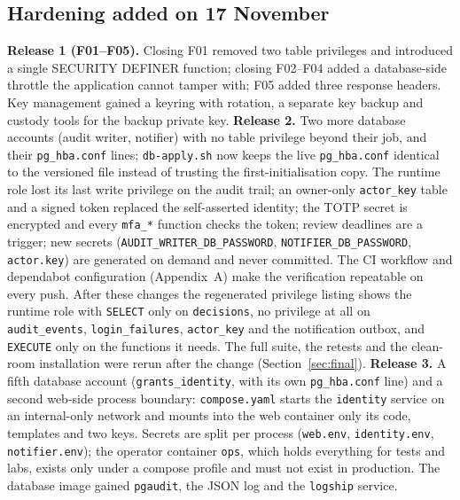\documentclass[10pt,a4paper]{article}
\newcommand{\code}[1]{\nolinkurl{#1}}
\begin{document}
\subsection{Hardening added on 17 November}
\textbf{Release 1 (F01--F05).} Closing F01 removed two table privileges and introduced a single SECURITY DEFINER function; closing F02--F04 added a database-side throttle the application cannot tamper with; F05 added three response headers. Key management gained a keyring with rotation, a separate key backup and custody tools for the backup private key.
\textbf{Release 2.} Two more database accounts (audit writer, notifier) with no table privilege beyond their job, and their \code{pg\_hba.conf} lines; \code{db-apply.sh} now keeps the live \code{pg\_hba.conf} identical to the versioned file instead of trusting the first-initialisation copy. The runtime role lost its last write privilege on the audit trail; an owner-only \code{actor\_key} table and a signed token replaced the self-asserted identity; the TOTP secret is encrypted and every \code{mfa\_*} function checks the token; review deadlines are a trigger; new secrets (\code{AUDIT\_WRITER\_DB\_PASSWORD}, \code{NOTIFIER\_DB\_PASSWORD}, \code{actor.key}) are generated on demand and never committed. The CI workflow and dependabot configuration (Appendix~A) make the verification repeatable on every push. After these changes the regenerated privilege listing shows the runtime role with \code{SELECT} only on \code{decisions}, no privilege at all on \code{audit\_events}, \code{login\_failures}, \code{actor\_key} and the notification outbox, and \code{EXECUTE} only on the functions it needs. The full suite, the retests and the clean-room installation were rerun after the change (Section~\ref{sec:final}).
\textbf{Release 3.} A fifth database account (\code{grants\_identity}, with its own \code{pg\_hba.conf} line) and a second web-side process boundary: \code{compose.yaml} starts the \code{identity} service on an internal-only network and mounts into the web container only its code, templates and two keys. Secrets are split per process (\code{web.env}, \code{identity.env}, \code{notifier.env}); the operator container \code{ops}, which holds everything for tests and labs, exists only under a compose profile and must not exist in production. The database image gained \code{pgaudit}, the JSON log and the \code{logship} service.
\end{document}
